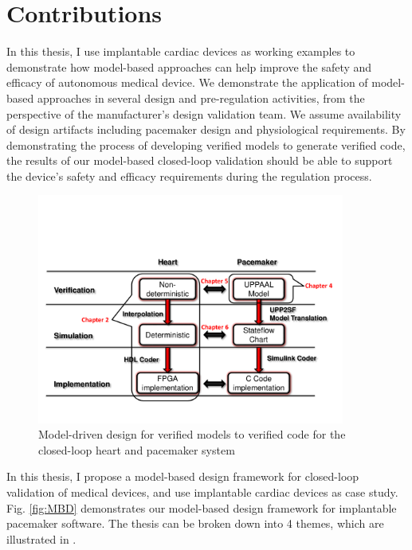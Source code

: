 \section{Contributions}
In this thesis, I use implantable cardiac devices as working examples to demonstrate how model-based approaches can help improve the safety and efficacy of autonomous medical device. We demonstrate the application of model-based approaches in several design and pre-regulation activities, from the perspective of the manufacturer's design validation team. We assume availability of design artifacts including pacemaker design and physiological requirements. By demonstrating the process of developing verified models to generate verified code, the results of our model-based closed-loop validation should be able to support the device's safety and efficacy requirements during the regulation process.
\begin{figure}[t]
		\centering
		\includegraphics[width=0.9\textwidth]{figs/model_based_b.pdf}
		\caption{\small Model-driven design for verified models to verified code for the closed-loop heart and pacemaker system}
		\label{fig:modeling_overview}
\end{figure}

In this thesis, I propose a model-based design framework for closed-loop validation of medical devices, and use implantable cardiac devices as case study.
Fig. \ref{fig:MBD} demonstrates our model-based design framework for implantable pacemaker software.
The thesis can be broken down into 4 themes, which are illustrated in . 

